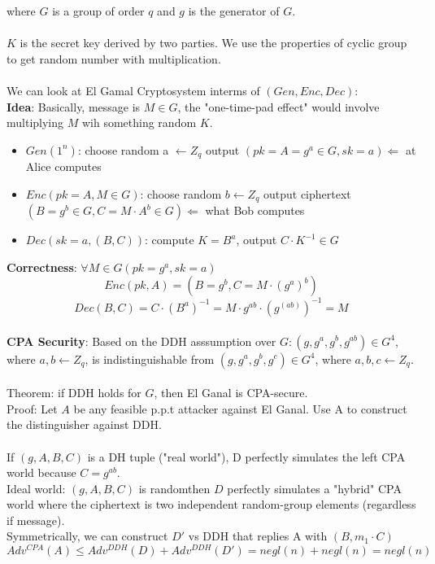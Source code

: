\documentclass{scribe}
\begin{document}
where $G$ is a group of order $q$ and $g$ is the generator of $G$.
\\\\
$K$  is the secret key derived by two parties. We use the properties of cyclic group to get random number with multiplication.
\\\\
We can look at El Gamal Cryptosystem interms of $(Gen, Enc, Dec):$
\\
\textbf{Idea}: Basically, message is $M \in G$, the "one-time-pad effect" would involve multiplying $M$ wih something random $K$. 
\begin{itemize} 
    \item $Gen(1^n)$: choose random a $\leftarrow Z_q $ output $(pk=A=g^a \in G, sk=a) \Leftarrow$ at Alice computes\\
    \item $Enc(pk=A,M \in G)$: choose random $b \leftarrow Z_q$ output ciphertext $(B = g^b \in G, C = M \cdot A^b \in G) \Leftarrow $ what Bob computes
    \item $Dec(sk=a,(B,C))$: compute $K=B^a$, output $C \cdot K^{-1} \in G$
\end{itemize}
\textbf{Correctness}: $\forall M \in G$\text{, }$(pk=g^a,sk=a)$
\[Enc(pk,A) = (B = g^b, C = M \cdot (g^a)^b)\]
\[Dec(B,C) = C \cdot (B^a)^{-1} = M \cdot g^{ab} \cdot (g^{(ab)})^{-1} = M\]
\vspace{5mm}
\\
\noindent\textbf{CPA Security}: Based on the DDH asssumption over $G: (g,g^a,g^b,g^{ab}) \in G^4$, where $a,b \leftarrow Z_q$, is indistinguishable from $(g,g^a,g^b,g^{c}) \in G^4$, where $a,b,c \leftarrow Z_q$.
\\\\
Theorem: if DDH holds for $G$, then El Ganal is CPA-secure.
\\
Proof: Let $A$ be any feasible p.p.t attacker against El Ganal. Use A to construct the distinguisher against DDH.
\\\\
If $(g,A,B,C)$ is a DH tuple ("real world"), D perfectly simulates the left CPA world because $C=g^{ab}$.
\\
Ideal world: $(g,A,B,C)$ is randomthen $D$ perfectly simulates a "hybrid" CPA world where the ciphertext is two independent random-group elements (regardless if message).
\\
Symmetrically, we can construct $D'$ vs DDH that replies A with $(B,m_1 \cdot C)$
\[Adv^{CPA}(A) \le Adv^{DDH}(D) + Adv^{DDH}(D') = negl(n)+negl(n) = negl(n)\]
\vspace{10mm}




%

\end{document}
